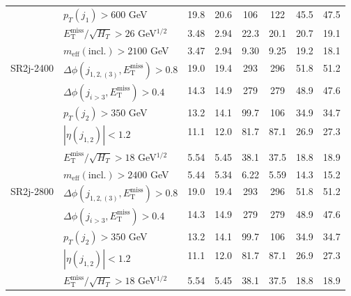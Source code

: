 \documentclass[10pt,fleqn]{article}
\newcommand{\met}{E^\mathrm{miss}_\mathrm{T}}
\newcommand{\meff}{m_\mathrm{eff}}
\begin{document}
\begin{table}[h!]
\begin{tabular}{c|l|c|c|c|c|c|c}
             & $p_T(j_1) > 600$ GeV                            &     19.8   &   20.6    &  106       &   122     &      45.5    &   47.5         \\                     
             & $\met/\sqrt{H_T} > 26$ GeV$^{1/2}$              &     3.48   &   2.94    &  22.3      &   20.1    &      20.7    &   19.1         \\    
             & $\meff(\mathrm{incl.}) > 2100$ GeV              &     3.47   &   2.94    &  9.30      &   9.25    &      19.2    &   18.1         \\ \midrule        
SR2j-2400    & $\Delta\phi(j_{1,2,(3)},\met) > 0.8$            &     19.0   &   19.4    &  293       &   296     &      51.8    &   51.2         \\
             & $\Delta\phi(j_{i>3},\met) > 0.4$                &     14.3   &   14.9    &  279       &   279     &      48.9    &   47.6         \\
             & $p_T(j_2) > 350$ GeV                            &     13.2   &   14.1    &  99.7      &   106     &      34.9    &   34.7         \\      
             & $|\eta(j_{1,2})|< 1.2$                          &     11.1   &   12.0    &  81.7      &   87.1    &      26.9    &   27.3         \\                   
             & $\met/\sqrt{H_T} > 18$ GeV$^{1/2}$              &     5.54   &   5.45    &  38.1      &   37.5    &      18.8    &   18.9         \\    
             & $\meff(\mathrm{incl.}) > 2400$ GeV              &     5.44   &   5.34    &  6.22      &   5.59    &      14.3    &   15.2         \\ \midrule                     
SR2j-2800    & $\Delta\phi(j_{1,2,(3)},\met) > 0.8$            &     19.0   &   19.4    &  293       &   296     &      51.8    &   51.2         \\
             & $\Delta\phi(j_{i>3},\met) > 0.4$                &     14.3   &   14.9    &  279       &   279     &      48.9    &   47.6         \\
             & $p_T(j_2) > 350$ GeV                            &     13.2   &   14.1    &  99.7      &   106     &      34.9    &   34.7         \\      
             & $|\eta(j_{1,2})|< 1.2$                          &     11.1   &   12.0    &  81.7      &   87.1    &      26.9    &   27.3         \\                   
             & $\met/\sqrt{H_T} > 18$ GeV$^{1/2}$              &     5.54   &   5.45    &  38.1      &   37.5    &      18.8    &   18.9         \\    

\end{tabular}
\end{table}
\end{document}
